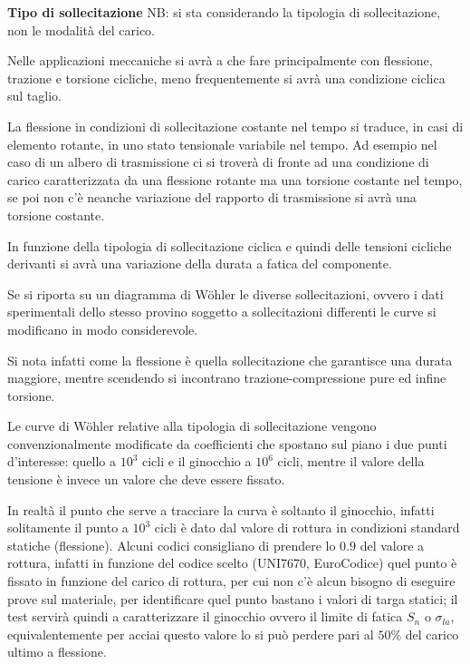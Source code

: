 \documentclass{article}
\begin{document}
\begin{adjustwidth}{2in}{}
			 \textbf{\Large Tipo di sollecitazione} \newline
			 NB: si sta considerando la tipologia di sollecitazione, non le modalità del carico. 
			 
			 Nelle applicazioni meccaniche si avrà a che fare principalmente con flessione, trazione e torsione  cicliche, meno frequentemente si avrà una condizione ciclica sul taglio. \newline 
			 
			 La flessione in condizioni di sollecitazione costante nel tempo si traduce, in casi di elemento rotante, in uno stato tensionale variabile nel tempo. Ad esempio nel caso di un albero di trasmissione ci si troverà di fronte ad una condizione di carico caratterizzata da una flessione rotante ma una torsione costante nel tempo, se poi non c'è neanche variazione del rapporto di trasmissione si avrà una torsione costante.
			 
			 In funzione della tipologia di sollecitazione ciclica e quindi delle tensioni cicliche derivanti si avrà una variazione della durata a fatica del componente. \newline
			 
			 Se si riporta su un diagramma di Wöhler le diverse sollecitazioni, ovvero i dati sperimentali dello stesso provino soggetto a sollecitazioni differenti le curve si modificano in modo considerevole. \newline
			 
			 Si nota infatti come la flessione è quella sollecitazione che garantisce una durata maggiore, mentre scendendo si incontrano trazione-compressione pure ed infine torsione. 
			 
			 Le curve di Wöhler relative alla tipologia di sollecitazione vengono convenzionalmente modificate da coefficienti che spostano sul piano i due punti d'interesse: quello a $10^3$ cicli e il ginocchio a $10^6$ cicli, mentre il valore della tensione è invece un valore che deve essere fissato.
			 
			 In realtà il punto che serve a tracciare la curva è soltanto il ginocchio, infatti solitamente il punto a $10^3$ cicli è dato dal valore di rottura in condizioni standard statiche (flessione). Alcuni codici consigliano di prendere lo $ 0.9 $ del valore a rottura, infatti in funzione del codice scelto (UNI7670, EuroCodice) quel punto è fissato in funzione del carico di rottura, per cui non c'è alcun bisogno di eseguire prove sul materiale, per identificare quel punto bastano i valori di targa statici; il test servirà quindi a caratterizzare il ginocchio ovvero il limite di fatica $ S_n $ o $\sigma_{la}$, equivalentemente per acciai questo valore lo si può perdere pari al $ 50\% $ del carico ultimo a flessione. 
			 

\end{adjustwidth}
\end{document}
